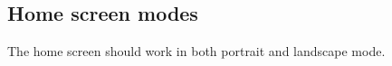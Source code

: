 \subsection{Home screen modes}
\label{backlog:home_screen_modes}
The home screen should work in both portrait and landscape mode.